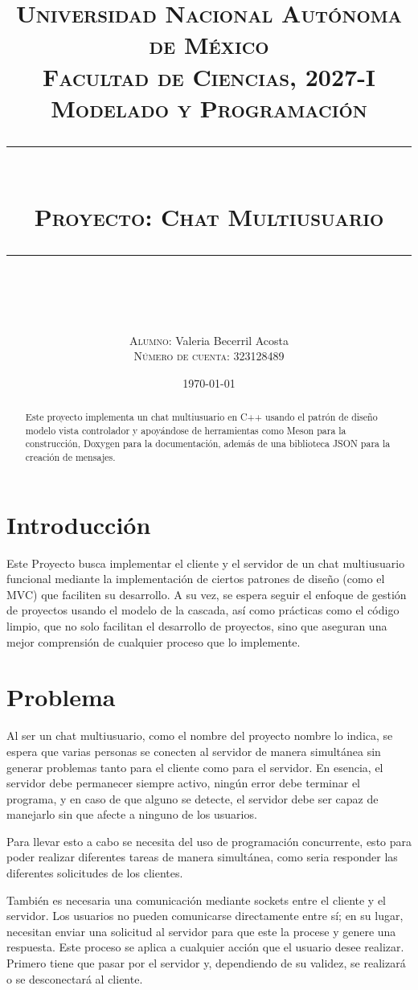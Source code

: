 \documentclass[12pt]{article}  %
\title{
    \textsc{\Large Universidad Nacional Autónoma de México\\[0.2cm]
        {\normalsize Facultad de Ciencias, 2027-I}\\[0.2cm]
        {\normalsize Modelado y Programación}}\\[0.6cm]
    \rule{\linewidth}{0.4pt}\\[0.4cm]
    {\textsc{\Large {\color{maincolor}Proyecto:} Chat Multiusuario}}\\[0.1cm]
    \rule{\linewidth}{0.4pt}\\[1em]
}
\author{
    \textsc{Alumno:} Valeria Becerril Acosta\\[0.2cm]
    \textsc{Número de cuenta:} 323128489\\[0.4cm]
}
\date{\today\\[2.6cm]}
\begin{document}
\maketitle
\thispagestyle{empty}

\begin{abstract}
Este proyecto implementa un chat multiusuario en C++ usando el patrón de diseño
modelo vista controlador y apoyándose de herramientas como Meson para la
construcción, Doxygen para la documentación, además de una biblioteca JSON para la
creación de mensajes.
\end{abstract}

\newpage
\tableofcontents

\newpage
\section*{Introducción}

Este Proyecto busca implementar el cliente y el servidor de un chat multiusuario
funcional mediante la implementación de ciertos patrones de diseño (como el MVC)
que faciliten su desarrollo. A su vez, se espera seguir el enfoque de gestión de
proyectos usando el modelo de la cascada, así como prácticas como el código
limpio, que no solo facilitan el desarrollo de proyectos, sino que aseguran una
mejor comprensión de cualquier proceso que lo implemente.

\section*{Problema}

Al ser un chat multiusuario, como el nombre del proyecto nombre lo indica, se
espera que varias personas se conecten al servidor de manera simultánea sin
generar problemas tanto para el cliente como para el servidor. En esencia, el
servidor debe permanecer siempre activo, ningún error debe terminar el programa,
y en caso de que alguno se detecte, el servidor debe ser capaz de manejarlo sin
que afecte a ninguno de los usuarios.

Para llevar esto a cabo se necesita del uso de programación concurrente, esto
para poder realizar diferentes tareas de manera simultánea, como seria responder
las diferentes solicitudes de los clientes.

También es necesaria una comunicación mediante sockets entre el cliente y el
servidor. Los usuarios no pueden comunicarse directamente entre sí; en su lugar,
necesitan enviar una solicitud al servidor para que este la procese y genere una
respuesta. Este proceso se aplica a cualquier acción que el usuario desee
realizar. Primero tiene que pasar por el servidor y, dependiendo de su validez,
se realizará o se desconectará al cliente.
\end{document}
